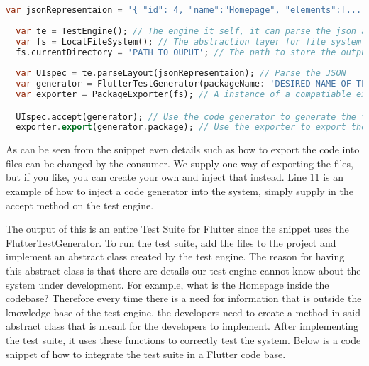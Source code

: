 \begin{lstlisting}[language=dart, caption={How to configure and use the Test Generator Package}]
  var jsonRepresentaion = '{ "id": 4, "name":"Homepage", "elements":[...]}'; //The output from the Mobile application
  
  var te = TestEngine(); // The engine it self, it can parse the json and use a codegenerator
  var fs = LocalFileSystem(); // The abstraction layer for file system
  fs.currentDirectory = 'PATH_TO_OUPUT'; // The path to store the output test suite
  
  var UIspec = te.parseLayout(jsonRepresentaion); // Parse the JSON
  var generator = FlutterTestGenerator(packageName: 'DESIRED NAME OF TEST PACKAGE'); // An instance of a compatiable code generator
  var exporter = PackageExporter(fs); // A instance of a compatiable exporter.

  UIspec.accept(generator); // Use the code generator to generate the test suite
  exporter.export(generator.package); // Use the exporter to export the test suite to the file system.
\end{lstlisting}

As can be seen from the snippet even details such as how to export the code into files can be changed by the consumer. 
We supply one way of exporting the files, but if you like, you can create your own and inject that instead. 
Line 11 is an example of how to inject a code generator into the system, simply supply in the accept method on the test engine.

The output of this is an entire Test Suite for Flutter since the snippet uses the FlutterTestGenerator. 
To run the test suite, add the files to the project and implement an abstract class created by the test engine. 
The reason for having this abstract class is that there are details our test engine cannot know about the system under development.
For example, what is the Homepage inside the codebase?
Therefore every time there is a need for information that is outside the knowledge base of the test engine, the developers need to create a method in said abstract class that is meant for the developers to implement. 
After implementing the test suite, it uses these functions to correctly test the system.
Below is a code snippet of how to integrate the test suite in a Flutter code base.

